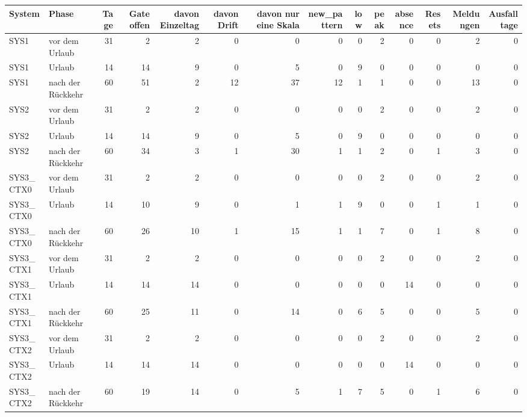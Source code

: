 \begin{tabular}{llrrrrrrrrrrrr}
\toprule
System & Phase & Tage & Gate offen & davon Einzeltag & davon Drift & davon nur eine Skala & new\_pattern & low & peak & absence & Resets & Meldungen & Ausfalltage \\
\midrule
SYS1 & vor dem Urlaub & 31 & 2 & 2 & 0 & 0 & 0 & 0 & 2 & 0 & 0 & 2 & 0 \\
SYS1 & Urlaub & 14 & 14 & 9 & 0 & 5 & 0 & 9 & 0 & 0 & 0 & 0 & 0 \\
SYS1 & nach der Rückkehr & 60 & 51 & 2 & 12 & 37 & 12 & 1 & 1 & 0 & 0 & 13 & 0 \\
SYS2 & vor dem Urlaub & 31 & 2 & 2 & 0 & 0 & 0 & 0 & 2 & 0 & 0 & 2 & 0 \\
SYS2 & Urlaub & 14 & 14 & 9 & 0 & 5 & 0 & 9 & 0 & 0 & 0 & 0 & 0 \\
SYS2 & nach der Rückkehr & 60 & 34 & 3 & 1 & 30 & 1 & 1 & 2 & 0 & 1 & 3 & 0 \\
SYS3\_CTX0 & vor dem Urlaub & 31 & 2 & 2 & 0 & 0 & 0 & 0 & 2 & 0 & 0 & 2 & 0 \\
SYS3\_CTX0 & Urlaub & 14 & 10 & 9 & 0 & 1 & 1 & 9 & 0 & 0 & 1 & 1 & 0 \\
SYS3\_CTX0 & nach der Rückkehr & 60 & 26 & 10 & 1 & 15 & 1 & 1 & 7 & 0 & 1 & 8 & 0 \\
SYS3\_CTX1 & vor dem Urlaub & 31 & 2 & 2 & 0 & 0 & 0 & 0 & 2 & 0 & 0 & 2 & 0 \\
SYS3\_CTX1 & Urlaub & 14 & 14 & 14 & 0 & 0 & 0 & 0 & 0 & 14 & 0 & 0 & 0 \\
SYS3\_CTX1 & nach der Rückkehr & 60 & 25 & 11 & 0 & 14 & 0 & 6 & 5 & 0 & 0 & 5 & 0 \\
SYS3\_CTX2 & vor dem Urlaub & 31 & 2 & 2 & 0 & 0 & 0 & 0 & 2 & 0 & 0 & 2 & 0 \\
SYS3\_CTX2 & Urlaub & 14 & 14 & 14 & 0 & 0 & 0 & 0 & 0 & 14 & 0 & 0 & 0 \\
SYS3\_CTX2 & nach der Rückkehr & 60 & 19 & 14 & 0 & 5 & 1 & 7 & 5 & 0 & 1 & 6 & 0 \\
\bottomrule
\end{tabular}
